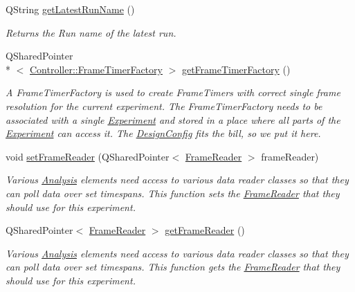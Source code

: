 \begin{DoxyCompactItemize}
Q\-String \hyperlink{class_picto_1_1_design_config_aed67c0f8b4d5a43e0efdc28ed6f817fa}{get\-Latest\-Run\-Name} ()
\begin{DoxyCompactList}\small\item\em Returns the Run name of the latest run. \end{DoxyCompactList}\item 
\hypertarget{class_picto_1_1_design_config_acfbabcdbf2f43d0628e813595b324d0a}{Q\-Shared\-Pointer\\*
$<$ \hyperlink{class_picto_1_1_controller_1_1_frame_timer_factory}{Controller\-::\-Frame\-Timer\-Factory} $>$ \hyperlink{class_picto_1_1_design_config_acfbabcdbf2f43d0628e813595b324d0a}{get\-Frame\-Timer\-Factory} ()}\label{class_picto_1_1_design_config_acfbabcdbf2f43d0628e813595b324d0a}

\begin{DoxyCompactList}\small\item\em A Frame\-Timer\-Factory is used to create Frame\-Timers with correct single frame resolution for the current experiment. The Frame\-Timer\-Factory needs to be associated with a single \hyperlink{class_picto_1_1_experiment}{Experiment} and stored in a place where all parts of the \hyperlink{class_picto_1_1_experiment}{Experiment} can access it. The \hyperlink{class_picto_1_1_design_config}{Design\-Config} fits the bill, so we put it here. \end{DoxyCompactList}\item 
void \hyperlink{class_picto_1_1_design_config_a1968415b652a74383a7dbe796186bf7e}{set\-Frame\-Reader} (Q\-Shared\-Pointer$<$ \hyperlink{class_picto_1_1_frame_reader}{Frame\-Reader} $>$ frame\-Reader)
\begin{DoxyCompactList}\small\item\em Various \hyperlink{class_picto_1_1_analysis}{Analysis} elements need access to various data reader classes so that they can poll data over set timespans. This function sets the \hyperlink{class_picto_1_1_frame_reader}{Frame\-Reader} that they should use for this experiment. \end{DoxyCompactList}\item 
Q\-Shared\-Pointer$<$ \hyperlink{class_picto_1_1_frame_reader}{Frame\-Reader} $>$ \hyperlink{class_picto_1_1_design_config_adcb3d8af7b88041a3116fcd36d99ecba}{get\-Frame\-Reader} ()
\begin{DoxyCompactList}\small\item\em Various \hyperlink{class_picto_1_1_analysis}{Analysis} elements need access to various data reader classes so that they can poll data over set timespans. This function gets the \hyperlink{class_picto_1_1_frame_reader}{Frame\-Reader} that they should use for this experiment. \end{DoxyCompactList}\item 

\end{DoxyCompactItemize}
